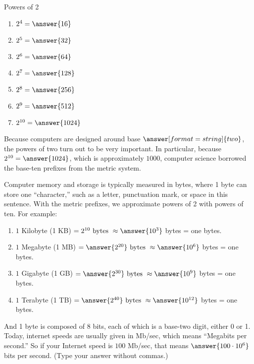 \documentclass[nooutcomes]{ximera}
\begin{document}
\begin{problem}
Powers of 2
\begin{enumerate}
\item $2^4 = \answer{16}$
\item $2^5 = \answer{32}$
\item $2^6 = \answer{64}$
\item $2^7 = \answer{128}$
\item $2^8 = \answer{256}$
\item $2^9 = \answer{512}$
\item $2^{10} = \answer{1024}$
\end{enumerate}
\end{problem}

\begin{problem}
Because computers are designed around base $\answer[format=string]{two}$, the powers of two turn out to be very important.  In particular, because $2^{10}=\answer{1024}$, which is approximately $1000$, computer science borrowed the base-ten prefixes from the metric system.  

Computer memory and storage is typically measured in bytes, where 1 byte can store one ``character,'' such as a letter, punctuation mark, or space in this sentence.  With the metric prefixes, we approximate powers of 2 with powers of ten.  For example: 
\begin{enumerate}
\item $1$ Kilobyte (1 KB) $=  2^{10}\textrm{ bytes }\approx \answer{10^3}$ bytes = one  bytes.
\item $1$ Megabyte (1 MB) $=  \answer{2^{20}} \textrm{ bytes } \approx \answer{10^6}$ bytes = one  bytes.
\item $1$ Gigabyte (1 GB) $=  \answer{2^{30}} \textrm{ bytes } \approx \answer{10^9}$ bytes = one  bytes.
\item $1$ Terabyte (1 TB) $=  \answer{2^{40}} \textrm{ bytes } \approx \answer{10^{12}}$ bytes = one  bytes.
\end{enumerate}

And 1 byte is composed of 8 bits, each of which is a base-two digit, either 0 or 1.  Today, internet speeds are usually given in Mb/sec, which means ``Megabits per second.'' So if your Internet speed is $100$ Mb/sec, 
that means $\answer{100\cdot10^6}$ bits per second.  (Type your answer without commas.)


\end{problem}
\end{document}
